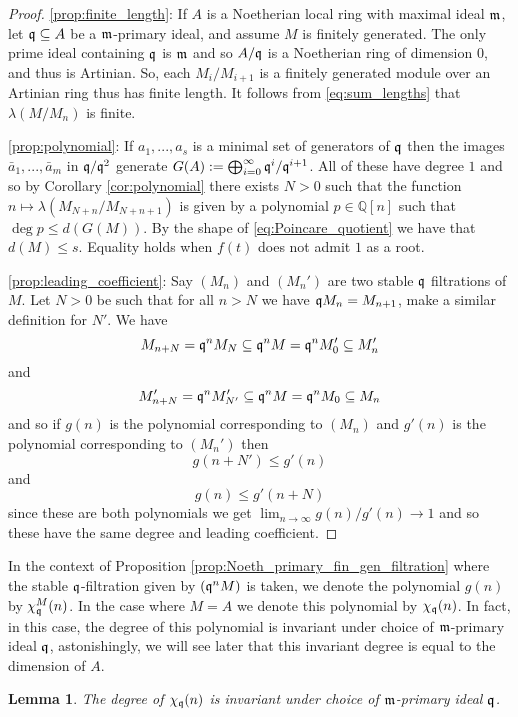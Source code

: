 \documentclass[12pt]{article}
\theoremstyle{plain}
\newtheorem{lemma}[thm]{Lemma}
\theoremstyle{definition}
\newcommand{\bb}[1]{\mathbb{#1}}
\newcommand{\lto}{\longrightarrow}
\begin{document}
	\begin{proof}
		\ref{prop:finite_length}: If $A$ is a Noetherian local ring with maximal ideal $\frak{m}$, let $\frak{q} \subseteq A$ be a $\frak{m}$-primary ideal, and assume $M$ is finitely generated. The only prime ideal containing $\frak{q}$ is $\frak{m}$ and so $A/\frak{q}$ is a Noetherian ring of dimension $0$, and thus is Artinian. So, each $M_i/M_{i+1}$ is a finitely generated module over an Artinian ring thus has finite length. It follows from \eqref{eq:sum_lengths} that $\lambda(M/M_n)$ is finite.
		
		\ref{prop:polynomial}: If $a_1,...,a_s$ is a minimal set of generators of $\frak{q}$ then the images $\bar{a}_1,...,\bar{a}_m$ in $\frak{q}/\frak{q}^2$ generate $G(A) := \bigoplus_{i = 0}^\infty \frak{q}^i/\frak{q}^{i+1}$. All of these have degree $1$ and so by Corollary \ref{cor:polynomial} there exists $N>0$ such that the function $n \mapsto \lambda(M_{N+n}/M_{N+n+1})$ is given by a polynomial $p \in \bb{Q}[n]$ such that $\operatorname{deg}p \leq d(G(M))$. By the shape of \eqref{eq:Poincare_quotient} we have that $d(M) \leq s$. Equality holds when $f(t)$ does not admit $1$ as a root.
		
		\ref{prop:leading_coefficient}: Say $(M_n)$ and $(M_n')$ are two stable $\frak{q}$ filtrations of $M$. Let $N > 0$ be such that for all $n > N$ we have $\frak{q}M_n = M_{n+1}$, make a similar definition for $N'$. We have
		\[M_{n + N} = \frak{q}^n M_N \subseteq \frak{q}^n M = \frak{q}^nM_0' \subseteq M_n'\]
		and
		\[M_{n + N}' = \frak{q}^n M_{N'}' \subseteq \frak{q}^n M = \frak{q}^nM_0 \subseteq M_n\]
		and so if $g(n)$ is the polynomial corresponding to $(M_n)$ and $g'(n)$ is the polynomial corresponding to $(M_n')$ then
		\[g(n + N') \leq g'(n)\]
		and
		\[g(n) \leq g'(n + N)\]
		since these are both polynomials we get $\lim_{n \lto \infty}g(n)/g'(n) \lto 1$ and so these have the same degree and leading coefficient.
	\end{proof}
	In the context of Proposition \ref{prop:Noeth_primary_fin_gen_filtration} where the stable $\frak{q}$-filtration given by $(\frak{q}^nM)$ is taken, we denote the polynomial $g(n)$ by $\chi_{\frak{q}}^M(n)$. In the case where $M = A$ we denote this polynomial by $\chi_\frak{q}(n)$. In fact, in this case, the degree of this polynomial is invariant under choice of $\frak{m}$-primary ideal $\frak{q}$, astonishingly, we will see later that this invariant degree is equal to the dimension of $A$.
	\begin{lemma}
		\label{lem:invariant_under_primary}
		The degree of $\chi_\frak{q}(n)$ is invariant under choice of $\frak{m}$-primary ideal $\frak{q}$.
	\end{lemma}
\end{document}
